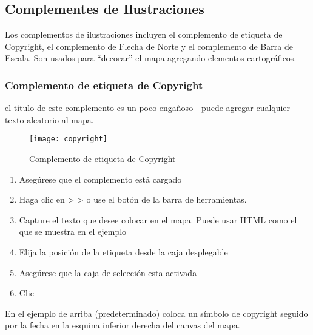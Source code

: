 
\subsection{Complementes de Ilustraciones}


Los complementos de ilustraciones incluyen el complemento de etiqueta de Copyright, el complemento de Flecha 
de Norte y el complemento de Barra de Escala. Son usados para ``decorar'' el mapa 
agregando elementos cartográficos. 

\subsubsection{Complemento de etiqueta de Copyright}

el título de este complemento es un poco engañoso - puede agregar cualquier texto aleatorio al mapa.

\begin{figure}[ht]
   \begin{center}
   \caption{Complemento de etiqueta de Copyright \nixcaption}\label{fig:copyright}\smallskip
   \texttt{[image: copyright]}
\end{center}  
\end{figure}

\begin{enumerate}
\item Asegúrese  que el complemento está cargado
\item Haga clic en  >  >  o use el botón  de la barra de herramientas.
\item Capture el texto que desee colocar en el mapa. Puede usar HTML como el que se muestra en 
  el ejemplo
\item Elija la posición de la etiqueta desde la caja desplegable 
\item Asegúrese que la caja de selección  esta activada
\item Clic  
\end{enumerate}

En el ejemplo de arriba (predeterminado) coloca un símbolo de copyright seguido por la fecha en la esquina inferior 
derecha del canvas del mapa.

